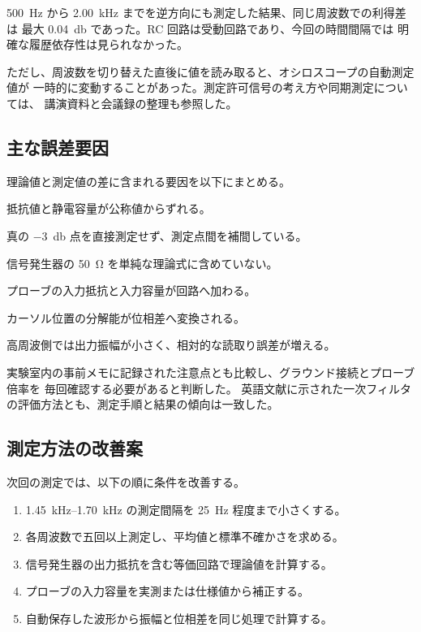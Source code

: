 \qty{500}{\hertz} から \qty{2.00}{\kilo\hertz} までを逆方向にも測定した結果、同じ周波数での利得差は
最大 \qty{0.04}{\decibel} であった。RC 回路は受動回路であり、今回の時間間隔では
明確な履歴依存性は見られなかった。

ただし、周波数を切り替えた直後に値を読み取ると、オシロスコープの自動測定値が
一時的に変動することがあった。測定許可信号の考え方や同期測定については、
講演資料と会議録の整理も参照した\cite{jp-inproceedings,jp-proceedings}。

\subsection{主な誤差要因}
\label{subsec:error-sources}

理論値と測定値の差に含まれる要因を以下にまとめる。

\begin{description}[leftmargin=10em,labelwidth=8.5em,itemsep=0.25em]
  \item[素子の公差] 抵抗値と静電容量が公称値からずれる。
  \item[周波数間隔] 真の \qty{-3}{\decibel} 点を直接測定せず、測定点間を補間している。
  \item[出力抵抗] 信号発生器の \qty{50}{\ohm} を単純な理論式に含めていない。
  \item[プローブ負荷] プローブの入力抵抗と入力容量が回路へ加わる。
  \item[時間差読取り] カーソル位置の分解能が位相差へ変換される。
  \item[振幅読取り] 高周波側では出力振幅が小さく、相対的な読取り誤差が増える。
\end{description}

実験室内の事前メモに記録された注意点とも比較し、グラウンド接続とプローブ倍率を
毎回確認する必要があると判断した\cite{jp-unpublished}。
英語文献に示された一次フィルタの評価方法とも、測定手順と結果の傾向は一致した\cite{en-article}。

\subsection{測定方法の改善案}
\label{subsec:improvements}

次回の測定では、以下の順に条件を改善する。

\begin{enumerate}[label=\arabic*.,leftmargin=3em,itemsep=0.35em]
  \item \qtyrange{1.45}{1.70}{\kilo\hertz} の測定間隔を \qty{25}{\hertz} 程度まで小さくする。
  \item 各周波数で五回以上測定し、平均値と標準不確かさを求める。
  \item 信号発生器の出力抵抗を含む等価回路で理論値を計算する。
  \item プローブの入力容量を実測または仕様値から補正する。
  \item 自動保存した波形から振幅と位相差を同じ処理で計算する。
\end{enumerate}

